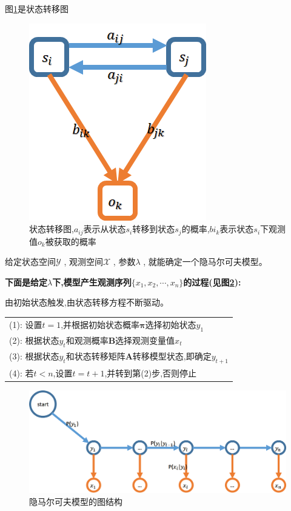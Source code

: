 \documentclass[UTF8,a4paper]{ctexart}%
\begin{document}
            图\ref{statusstransferfig}是状态转移图
            \begin{figure}[!htbp]
              \centering
              \includegraphics[scale=0.5]{assets/jiqixuexi4_85f62.png}
              \caption{状态转移图,$a_{ij}$表示从状态$s_i$转移到状态$s_j$的概率,$b{i_k}$表示状态$s_i$下观测值$o_k$被获取的概率}
              \label{statusstransferfig}
            \end{figure}

            给定状态空间$\mathcal{Y}$ , 观测空间$\mathcal{X}$ , 参数$\lambda$ , 就能确定一个隐马尔可夫模型。

            \textbf{下面是给定$\lambda$下,模型产生观测序列$\{x_1, x_2, \cdots , x_n\}$的过程(见图\ref{generationOfHMM}):}

            {\color{blue}
              由初始状态触发,由状态转移方程不断驱动。
            }

            \begin{tabular}{l}
              \hline
              (1): 设置$t=1$,并根据初始状态概率$\bm{\pi}$选择初始状态$y_1$\\
              (2): 根据状态$y_t$和观测概率$\bm{B}$选择观测变量值$x_t$\\
              (3): 根据状态$y_t$和状态转移矩阵$\bm{A}$转移模型状态,即确定$y_{t+1}$\\
              (4): 若$t<n$,设置$t=t+1$,并转到第(2)步,否则停止\\
              \hline
            \end{tabular}

            \begin{figure}[!htbp]
              \centering
              \includegraphics[scale=0.4]{assets/jiqixuexi4_06c36.png}
              \caption{隐马尔可夫模型的图结构}
              \label{generationOfHMM}
            \end{figure}
\end{document}
